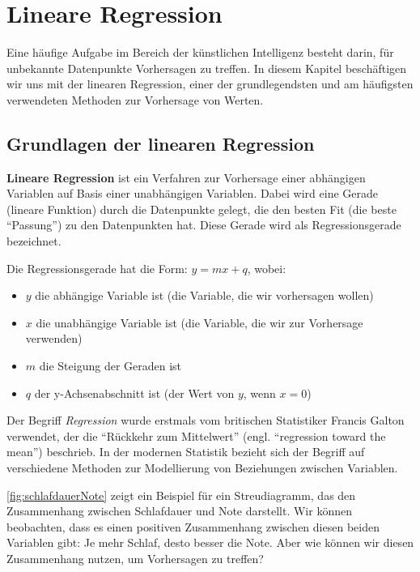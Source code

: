 \chapter{Lineare Regression}

Eine häufige Aufgabe im Bereich der künstlichen Intelligenz besteht darin, für unbekannte Datenpunkte Vorhersagen zu treffen. In diesem Kapitel beschäftigen wir uns mit der linearen Regression, einer der grundlegendsten und am häufigsten verwendeten Methoden zur Vorhersage von Werten.

\section{Grundlagen der linearen Regression}

\begin{mydefinition}
\textbf{Lineare Regression} ist ein Verfahren zur Vorhersage einer abhängigen Variablen auf Basis einer unabhängigen Variablen. Dabei wird eine Gerade (lineare Funktion) durch die Datenpunkte gelegt, die den besten Fit (die beste \enquote{Passung}) zu den Datenpunkten hat. Diese Gerade wird als Regressionsgerade bezeichnet.

Die Regressionsgerade hat die Form: $y = mx + q$, wobei:
\begin{itemize}
    \item $y$ die abhängige Variable ist (die Variable, die wir vorhersagen wollen)
    \item $x$ die unabhängige Variable ist (die Variable, die wir zur Vorhersage verwenden)
    \item $m$ die Steigung der Geraden ist
    \item $q$ der y-Achsenabschnitt ist (der Wert von $y$, wenn $x = 0$)
\end{itemize}

Der Begriff \textit{Regression} wurde erstmals vom britischen Statistiker Francis Galton verwendet, der die \enquote{Rückkehr zum Mittelwert} (engl. \enquote{regression toward the mean}) beschrieb. In der modernen Statistik bezieht sich der Begriff auf verschiedene Methoden zur Modellierung von Beziehungen zwischen Variablen.
\end{mydefinition}

\cref{fig:schlafdauerNote} zeigt ein Beispiel für ein Streudiagramm, das den Zusammenhang zwischen Schlafdauer und Note darstellt. Wir können beobachten, dass es einen positiven Zusammenhang zwischen diesen beiden Variablen gibt: Je mehr Schlaf, desto besser die Note. Aber wie können wir diesen Zusammenhang nutzen, um Vorhersagen zu treffen?

